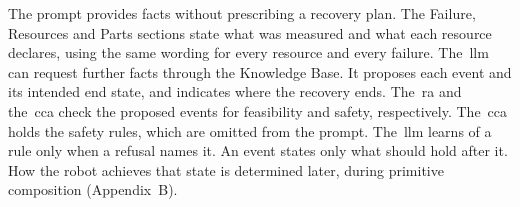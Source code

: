 The prompt provides facts without prescribing a recovery plan. The Failure, Resources and Parts
sections state what was measured and what each resource declares, using the same wording for
every resource and every failure. The~\gls{llm} can request further facts through the Knowledge Base.
It proposes each event and its intended end state, and indicates where the recovery ends.
The~\gls{ra} and the~\gls{cca} check the proposed events for feasibility and safety, respectively. The~\gls{cca} holds the safety rules,
which are omitted from the prompt. The~\gls{llm} learns of a rule only when a refusal names it.
An event states only what should hold after it. How the robot achieves that state is determined
later, during primitive composition (Appendix~B).
